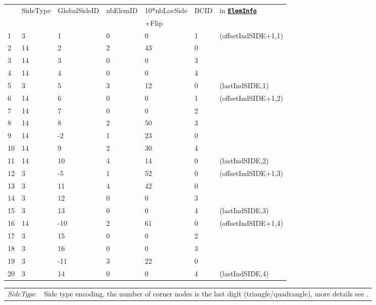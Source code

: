 \documentclass[a4paper,headsepline]{scrreprt}
\newcommand\rf[1]{\prettyref{#1}}
\newcommand\ttbf[1]{\textbf{\texttt{#1}}}
\newcommand\ElemInfo{\hyperlink{ElemInfo}{\ttbf{ElemInfo}}}
\newcommand\nSides{\ttbf{nSides}}
\begin{document}
\begin{table}[h!]
\centering
\begin{tabular}{|l|l|l|l|l|l||l|}
\hline
  & SideType & GlobalSideID & nbElemID & 10*nbLocSide   & BCID  & in \ElemInfo \\ 
  &          &        &          &  +Flip   &       &              \\\hline\hline
1  &  3 &  1 & 0 &  0 & 1 &  (offsetIndSIDE+1,1) \\ 
2  & 14 &  2 & 2 & 43 & 0 &  \\ 
3  & 14 &  3 & 0 &  0 & 3 &  \\ 
4  & 14 &  4 & 0 &  0 & 4 &  \\ 
5  &  3 &  5 & 3 & 12 & 0 &  (lastIndSIDE,1) \\ \hline 
6  & 14 &  6 & 0 &  0 & 1 &  (offsetIndSIDE+1,2) \\ 
7  & 14 &  7 & 0 &  0 & 2 &  \\ 
8  & 14 &  8 & 2 & 50 & 3 &  \\ 
9  & 14 & -2 & 1 & 23 & 0 &  \\ 
10 & 14 &  9 & 2 & 30 & 4 &  \\ 
11 & 14 & 10 & 4 & 14 & 0 &  (lastIndSIDE,2) \\ \hline
12 &  3 & -5 & 1 & 52 & 0 &  (offsetIndSIDE+1,3) \\ 
13 &  3 & 11 & 4 & 42 & 0 &  \\ 
14 &  3 & 12 & 0 &  0 & 3 &  \\ 
15 &  3 & 13 & 0 &  0 & 4 &  (lastIndSIDE,3) \\ \hline%
16 & 14 &-10 & 2 & 61 & 0 &  (offsetIndSIDE+1,4) \\ 
17 &  3 & 15 & 0 &  0 & 2 &  \\ 
18 &  3 & 16 & 0 &  0 & 3 &  \\ 
19 &  3 &-11 & 3 & 22 & 0 &  \\ 
20 &  3 & 14 & 0 &  0 & 4 &  (lastIndSIDE,4) \\ \hline%
\end{tabular}\vspace{2ex}
\begin{tabularx}{1.0\textwidth}{|lX|}\hline
\emph{SideType}:        & Side type encoding, the number of corner nodes is the last digit (triangle/quadrangle), more details see \rf{sec:elemtypes}. \\

\end{tabularx}
\end{table}
\end{document}
